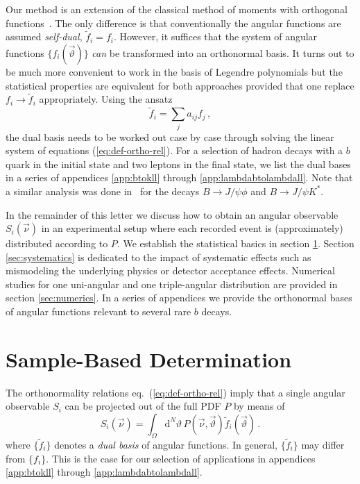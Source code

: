\documentclass[aps,prd,reprint,nofootinbib,preprintnumbers]{revtex4}
\newcommand{\dual}[1]{\tilde{#1}}
\newcommand{\nuvec}{\vec{\nu}}
\newcommand{\refeq}[1]{eq.~(\ref{eq:#1})}
\newcommand{\rmdx}[1]{\mbox{d} #1 \,} %
\newcommand{\thvec}{\vec{\vartheta}}
\renewcommand{\theta}{\vartheta}
\newcommand{\citeneeded}{{\color{red}\bf [cite needed]}}
\begin{document}
Our method is an extension of the classical method of moments with
orthogonal functions~\cite[sec. 8.2]{James:2006zz}. The only difference
is that conventionally the angular functions are assumed
\emph{self-dual}, $\dual{f}_i = f_i$. However, it suffices that the
system of angular functions $\{f_i(\thvec)\}$ \emph{can} be transformed into
an orthonormal basis. It turns out to be much more convenient to work
in the basis of Legendre polynomials but the statistical properties
are equivalent for both approaches provided that one replace $f_i \to
\dual{f}_i$ appropriately. Using the ansatz
\begin{equation}
  \label{eq:dual-ansatz}
  \dual{f}_i = \sum_{j} a_{ij} f_j \,,
\end{equation}
the dual basis needs to be worked out case by case through solving the
linear system of equations (\ref{eq:def-ortho-rel}). For a selection
of hadron decays with a $b$ quark in the initial state and two leptons
in the final state, we list the dual bases in a series of appendices
\ref{app:btokll} through \ref{app:lambdabtolambdall}. Note that a
similar analysis was done in~\cite{Dighe:1998vk} for the decays $B \to
J/\psi \phi$ and $B \to J/\psi K^{*}$.

In the remainder of this letter we discuss how to obtain an angular
observable $S_i(\nuvec)$ in an experimental setup where each recorded
event is (approximately) distributed according to $P$.  We establish
the statistical basics in section \ref{sec:sample-based-det}. Section
\ref{sec:systematics} is dedicated to the impact of systematic effects
such as mismodeling the underlying physics or detector acceptance
effects. Numerical studies for one uni-angular and one triple-angular
distribution are provided in section \ref{sec:numerics}. In a series
of appendices we provide the orthonormal bases of angular functions
relevant to several rare $b$ decays.



\section{Sample-Based Determination}
\label{sec:sample-based-det}

The orthonormality relations \refeq{def-ortho-rel} imply that a single angular observable $S_i$
can be projected out of the full PDF $P$ by means of
\begin{equation}
    \label{eq:det-Pi-analytical}
    S_i(\nuvec) = \int_{\Omega} \rmdx{^N \theta}  P(\nuvec, \thvec) \dual{f}_i(\thvec)\,.
\end{equation}
where $\lbrace \dual{f}_i \rbrace$ denotes a \emph{dual basis} of angular functions. In general, $\lbrace \dual{f}_i \rbrace$ may differ from $\lbrace f_i \rbrace$. This is the
case for our selection of applications in appendices \ref{app:btokll} through \ref{app:lambdabtolambdall}.\\
\end{document}
